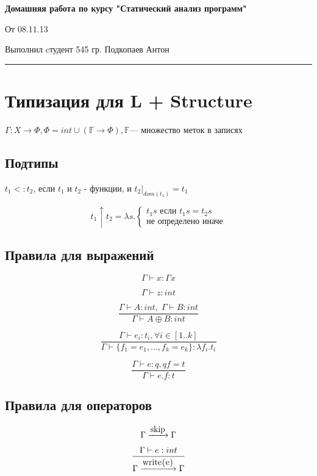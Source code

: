 \documentclass{article}
\newcommand{\trule}[2]{\frac{#1}{#2}}
\newcommand{\withenv}[2]{{#1}\vdash{#2}}
\newcommand{\trans}[3]{{#1}\xrightarrow{#2}{#3}}
\newcommand{\llang}[1]{\mbox{\lstinline[mathescape]|#1|}}
\begin{document}
\textbf{Домашняя работа по курсу "Статический анализ программ"}

\hfill От 08.11.13

\hfill Выполнил cтудент 545 гр. Подкопаев Антон

\hrule
\vspace{1.2cm}

\section*{Типизация для L + Structure}

$\Gamma: X \rightarrow \Phi, \Phi = int \cup (\mathbb{F} \rightarrow \Phi), \mathbb{F} $--- множество меток в записях

\subsection*{Подтипы}

$t_1 <: t_2$, если $t_1$ и $t_2$ - функции, и $t_2|_{dom(t_1)} = t_1$


\[
t_1 \uparrow t_2 = \lambda s.
\begin{cases}
	t_1 s \text{ если } t_1 s = t_2 s
	\\
	\text{не определено иначе}
\end{cases}
\]

\subsection*{Правила для выражений}

$$
\withenv{\Gamma}{
	x : \Gamma x
}
$$

$$
\withenv{\Gamma}{
	z : int
}
$$

$$
\trule{
	\withenv{\Gamma}{A : int},\;\withenv{\Gamma}{B : int}
}
{
	\withenv{\Gamma}{A \oplus B : int}
}
$$

$$
\trule{
	\withenv{\Gamma}{e_i : t_i, \forall i \in [1..k]}
}
{
	\withenv{\Gamma}{\{f_{1} = e_{1}, ..., f_{k} = e_{k}\} : \lambda f_i . t_i}
}
$$

$$
\trule{
	\withenv{\Gamma}{e : q, q f = t}
}
{
	\withenv{\Gamma}{e . f : t}
}
$$

\subsection*{Правила для операторов}

$$
\trans{\Gamma}{\llang{skip}}{\Gamma}
$$

$$
\trule{
	\withenv{\Gamma}{e : int}
}
{
	\trans{\Gamma}{\llang{write(e)}}{\Gamma}
}
$$
\end{document}
